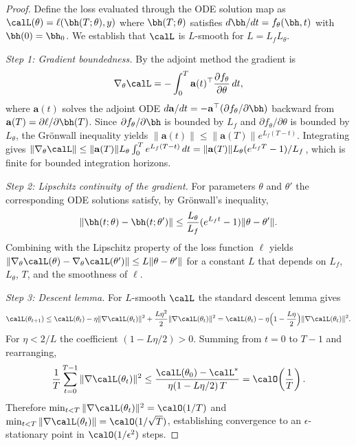 \begin{proof}
Define the loss evaluated through the ODE solution map as $\calL(\theta) = \ell(\bh(T;\theta),y)$ where $\bh(T;\theta)$ satisfies $d\bh/dt = f_\theta(\bh,t)$ with $\bh(0)=\bh_0$. We establish that $\calL$ is $L$-smooth for $L = L_f L_\theta$.

\textit{Step 1: Gradient boundedness.} By the adjoint method the gradient is
\begin{equation}
\nabla_\theta\calL = -\int_0^T \mathbf{a}(t)^\top \frac{\partial f_\theta}{\partial\theta}\,dt,
\end{equation}
where $\mathbf{a}(t)$ solves the adjoint ODE $d\mathbf{a}/dt = -\mathbf{a}^\top(\partial f_\theta/\partial\bh)$ backward from $\mathbf{a}(T)=\partial\ell/\partial\bh(T)$. Since $\partial f_\theta/\partial\bh$ is bounded by $L_f$ and $\partial f_\theta/\partial\theta$ is bounded by $L_\theta$, the Gr\"{o}nwall inequality yields $\|\mathbf{a}(t)\|\le\|\mathbf{a}(T)\|e^{L_f(T-t)}$. Integrating gives $\|\nabla_\theta\calL\|\le \|\mathbf{a}(T)\|L_\theta\int_0^T e^{L_f(T-t)}\,dt = \|\mathbf{a}(T)\|L_\theta(e^{L_f T}-1)/L_f$, which is finite for bounded integration horizons.

\textit{Step 2: Lipschitz continuity of the gradient.} For parameters $\theta$ and $\theta'$ the corresponding ODE solutions satisfy, by Gr\"{o}nwall's inequality,
\begin{equation}
\|\bh(t;\theta)-\bh(t;\theta')\| \le \frac{L_\theta}{L_f}(e^{L_f t}-1)\|\theta-\theta'\|.
\end{equation}
Combining with the Lipschitz property of the loss function $\ell$ yields $\|\nabla_\theta\calL(\theta)-\nabla_\theta\calL(\theta')\| \le L\|\theta-\theta'\|$ for a constant $L$ that depends on $L_f$, $L_\theta$, $T$, and the smoothness of $\ell$.

\textit{Step 3: Descent lemma.} For $L$-smooth $\calL$ the standard descent lemma gives
\begin{equation}
\calL(\theta_{t+1}) \le \calL(\theta_t) - \eta\|\nabla\calL(\theta_t)\|^2 + \frac{L\eta^2}{2}\|\nabla\calL(\theta_t)\|^2
= \calL(\theta_t) - \eta\Bigl(1-\frac{L\eta}{2}\Bigr)\|\nabla\calL(\theta_t)\|^2.
\end{equation}
For $\eta < 2/L$ the coefficient $(1-L\eta/2)>0$. Summing from $t=0$ to $T-1$ and rearranging,
\begin{equation}
\frac{1}{T}\sum_{t=0}^{T-1}\|\nabla\calL(\theta_t)\|^2
\le \frac{\calL(\theta_0)-\calL^*}{\eta(1-L\eta/2)\,T}
= \calO\!\left(\frac{1}{T}\right).
\end{equation}
Therefore $\min_{t<T}\|\nabla\calL(\theta_t)\|^2 = \calO(1/T)$ and $\min_{t<T}\|\nabla\calL(\theta_t)\| = \calO(1/\sqrt{T})$, establishing convergence to an $\epsilon$-stationary point in $\calO(1/\epsilon^2)$ steps.
\end{proof}


